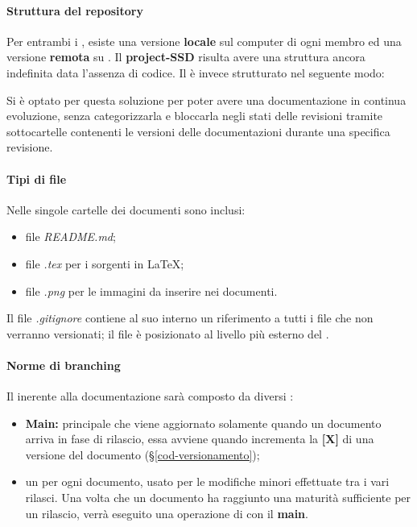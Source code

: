 {{\paragraph*{Struttura del repository}
Per entrambi i , esiste una versione \textbf{locale} sul computer di ogni membro ed una versione \textbf{remota} su \textit{}.\newline
Il  \textbf{project-SSD} risulta avere una struttura ancora indefinita data l'assenza di codice.\newline
Il  \textbf{\repoDoc{}} è invece strutturato nel seguente modo:
Si è optato per questa soluzione per poter avere una documentazione in continua evoluzione, senza categorizzarla e bloccarla negli stati delle revisioni tramite sottocartelle contenenti le versioni delle documentazioni durante una specifica revisione.
\paragraph*{Tipi di file}
Nelle singole cartelle dei documenti sono inclusi:
\begin{itemize}
\item file \textit{README.md};
\item file \textit{.tex} per i sorgenti in \LaTeX; 
\item file \textit{.png} per le immagini da inserire nei documenti.
\end{itemize}
Il file \textit{.gitignore} contiene al suo interno un riferimento a tutti i file che non verranno versionati; il file è posizionato al livello più esterno del .
\paragraph*{Norme di branching}
\label{NormeBranching}
Il  inerente alla documentazione sarà composto da diversi :
\begin{itemize}
	\item \textbf{Main:}  principale che viene aggiornato solamente quando un documento arriva in fase di rilascio, essa avviene quando incrementa la \textbf{[X]} di una versione del documento (\S{}\ref{cod-versionamento});
	\item un  per ogni documento, usato per le modifiche minori effettuate tra i vari rilasci. Una volta che un documento ha raggiunto una maturità sufficiente per un rilascio, verrà eseguito una operazione di  con il \textbf{main}.
\end{itemize}
}}
